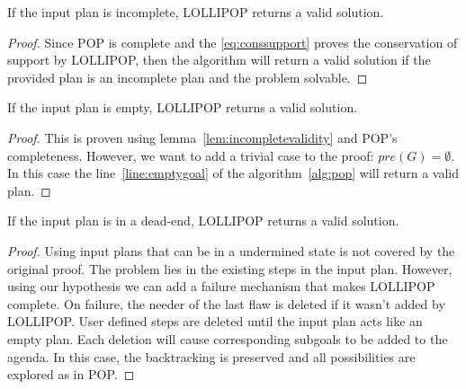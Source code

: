 \begin{lemma}\label{lem:incompletevalidity}

If the input plan is incomplete, LOLLIPOP returns a valid solution.

\end{lemma}

\begin{proof}

Since POP is complete and the \cref{eq:conssupport} proves the
conservation of support by LOLLIPOP, then the algorithm will return a
valid solution if the provided plan is an incomplete plan and the
problem solvable. \qedhere

\end{proof}

\begin{lemma}

If the input plan is empty, LOLLIPOP returns a valid solution.

\end{lemma}

\begin{proof}

This is proven using lemma~\ref{lem:incompletevalidity} and POP's
completeness. However, we want to add a trivial case to the proof:
\(pre(G) = \emptyset\). In this case the line~\ref{line:emptygoal} of
the algorithm~\ref{alg:pop} will return a valid plan. \qedhere

\end{proof}

\begin{lemma}\label{lem:deadend-validity}

If the input plan is in a dead-end, LOLLIPOP returns a valid solution.

\end{lemma}

\begin{proof}

Using input plans that can be in a undermined state is not covered by
the original proof. The problem lies in the existing steps in the input
plan. However, using our hypothesis we can add a failure mechanism that
makes LOLLIPOP complete. On failure, the needer of the last flaw is
deleted if it wasn't added by LOLLIPOP. User defined steps are deleted
until the input plan acts like an empty plan. Each deletion will cause
corresponding subgoals to be added to the agenda. In this case, the
backtracking is preserved and all possibilities are explored as in POP.
\qedhere

\end{proof}

